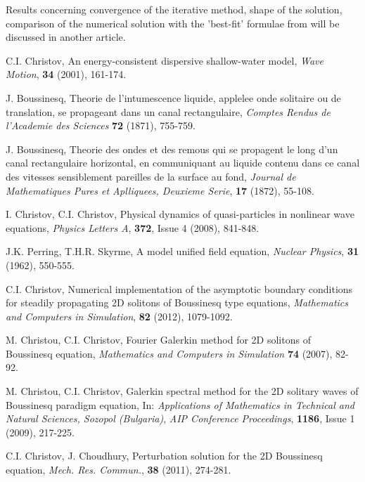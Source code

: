 \documentclass[12pt]{article}
\theoremstyle{theorem}
\theoremstyle{defi}
\begin{document}
Results concerning convergence of the iterative method, shape of the solution, comparison of the numerical solution with the 'best-fit' formulae from \cite{ref10} will be discussed in another article.


\begin{thebibliography}{99} \normalsize

 C.I. Christov, An energy-consistent dispersive shallow-water model,  {\it Wave Motion}, \textbf{34} (2001), 161-174.

 J. Boussinesq,
Theorie de l’intumescence liquide, applelee onde solitaire ou de translation, se propageant dans un canal rectangulaire,
{\it Comptes Rendus de l’Academie des Sciences} \textbf{72} (1871), 755-759.

 J. Boussinesq,
Theorie des ondes et des remous qui se propagent le long d’un canal rectangulaire horizontal,
en communiquant au liquide contenu dans ce canal des vitesses sensiblement pareilles de la surface au fond,
{\it Journal de Mathematiques Pures et Aplliquees, Deuxieme Serie}, \textbf{17} (1872), 55-108.

 I. Christov, C.I. Christov, Physical dynamics of quasi-particles in nonlinear wave equations,
{\it Physics Letters A}, \textbf{372}, Issue 4 (2008),  841-848.

 J.K. Perring, T.H.R. Skyrme, A model unified field equation, {\it Nuclear Physics},  \textbf{31} (1962), 550-555.

  C.I. Christov,
Numerical implementation of the asymptotic boundary conditions for steadily propagating 2D solitons of Boussinesq type equations,
{\it Mathematics and Computers in Simulation}, \textbf{82} (2012), 1079-1092.

  M. Christou, C.I. Christov,
Fourier Galerkin method for 2D solitons of Boussinesq equation,
{\it Mathematics and Computers in Simulation} \textbf{74} (2007), 82-92.

   M. Christou, C.I. Christov,
Galerkin spectral method for the 2D solitary waves of Boussinesq paradigm equation,
In: {\it Applications of Mathematics in Technical and Natural Sciences, Sozopol (Bulgaria)},
\emph{AIP Conference Proceedings}, \textbf{1186}, Issue 1 (2009), 217-225.

 C.I. Christov, J. Choudhury, Perturbation solution for the 2D Boussinesq equation, {\it Mech. Res. Commun.}, \textbf{38} (2011), 274-281.


\end{thebibliography}
\end{document}
